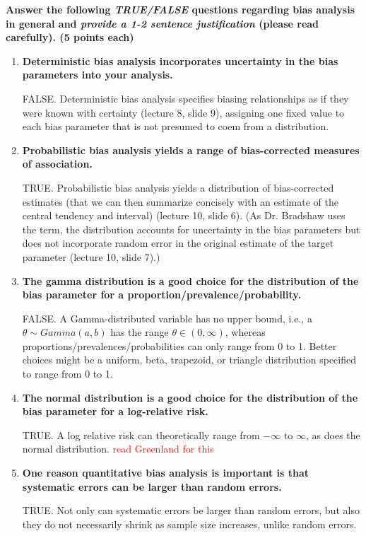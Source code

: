 \documentclass[
  11pt,
]{article}
\begin{document}
\textbf{Answer the following \textit{TRUE/FALSE} questions regarding bias analysis in general and \textit{provide a 1-2 sentence justification} (please read carefully). (5 points each)}

\begin{enumerate}[label=\textbf{\arabic*.}]
  \item \textbf{Deterministic bias analysis incorporates uncertainty in the bias parameters into your analysis.}

FALSE. Deterministic bias analysis specifies biasing relationships as if they were known with certainty (lecture 8, slide 9), assigning one fixed value to each bias parameter that is not presumed to coem from a distribution.

  \item \textbf{Probabilistic bias analysis yields a range of bias-corrected measures of association.}

TRUE. Probabilistic bias analysis yields a distribution of bias-corrected estimates (that we can then summarize concisely with an estimate of the central tendency and interval) (lecture 10, slide 6). (As Dr. Bradshaw uses the term, the distribution accounts for uncertainty in the bias parameters but does not incorporate random error in the original estimate of the target parameter (lecture 10, slide 7).)

  \item \textbf{The gamma distribution is a good choice for the distribution of the bias parameter for a proportion/prevalence/probability.}
  
FALSE. A Gamma-distributed variable has no upper bound, i.e., a $\theta \sim Gamma(a, b)$ has the range $\theta \in (0, \infty)$, whereas proportions/prevalences/probabilities can only range from 0 to 1. Better choices might be a uniform, beta, trapezoid, or triangle distribution specified to range from 0 to 1.

  \item \textbf{The normal distribution is a good choice for the distribution of the bias parameter for a log-relative risk.}
  
TRUE. A log relative risk can theoretically range from $-\infty$ to $\infty$, as does the normal distribution. \textcolor{red}{read Greenland for this}

  \item \textbf{One reason quantitative bias analysis is important is that systematic errors can be larger than random errors.}
  
TRUE. Not only can systematic errors be larger than random errors, but also they do not necessarily shrink as sample size increases, unlike random errors.

\end{enumerate}
\end{document}
